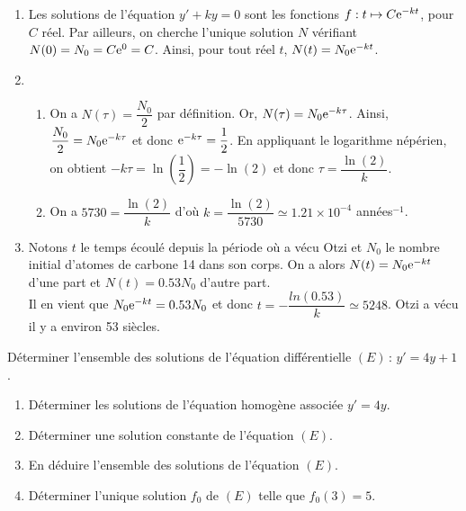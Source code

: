 \documentclass[11pt,fleqn, openany]{book} %
\begin{document}
\begin{solution}\hspace{0pt}
\begin{enumerate}
	\item Les solutions de l'équation \(y'+ky=0\) sont les fonctions \(f:t\mapsto C\mathrm{e}^{-kt}\), pour \(C\) réel. Par ailleurs, on cherche l'unique solution \(N\) vérifiant \(N(0)=N_0 = C\mathrm{e}^0=C\). Ainsi, pour tout réel \(t\), \(N(t)=N_0\mathrm{e}^{-kt}\).

\item 
	\begin{enumerate}
	\item On a \(N(\tau)=\dfrac{N_0}{2}\) par définition. Or, \(N(\tau)=N_0\mathrm{e}^{-k\tau}\). Ainsi, \(\dfrac{N_0}{2}=N_0\mathrm{e}^{-k\tau}\) et donc \(\mathrm{e}^{-k\tau}=\dfrac{1}{2}\). En appliquant le logarithme népérien, on obtient \(-k\tau=\ln\left(\dfrac{1}{2}\right)=-\ln (2)\) et donc \(\tau = \dfrac{\ln(2)}{k}\).
	\item On a \(5730=\dfrac{\ln(2)}{k}\) d'où \(k=\dfrac{\ln (2)}{5730}\simeq 1.21 \times 10^{-4}\) années$^{-1}$.
	
\end{enumerate}
	\item Notons \(t\) le temps écoulé depuis la période où a vécu Otzi et \(N_0\) le nombre initial d'atomes de carbone 14 dans son corps. On a alors \(N(t)=N_0\mathrm{e}^{-kt}\) d'une part et \(N(t)=0.53N_0\) d'autre part. \\Il en vient que \(N_0\mathrm{e}^{-kt}=0.53N_0\) et donc \(t=-\dfrac{ln(0.53)}{k}\simeq 5248\). Otzi a vécu il y a environ 53 siècles.
\end{enumerate}
\end{solution}




\begin{exercise}[topic=diff03]Déterminer l'ensemble des solutions de l'équation différentielle $(E)\,:\,y'=4y+1$. 
\begin{enumerate}
\item Déterminer les solutions de l'équation homogène associée $y'=4y$.
\item Déterminer une solution constante de l'équation $(E)$.
\item En déduire l'ensemble des solutions de l'équation $(E)$.
\item Déterminer l'unique solution $f_0$ de $(E)$ telle que $f_0(3)=5$.
\end{enumerate}\end{exercise}
\end{document}
